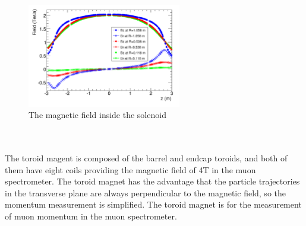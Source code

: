\begin{figure}[!h]                
	\includegraphics[width=0.6\textwidth]{Chapter2/bfield}
	\centering
	\begin{center}
		\caption{The magnetic field inside the solenoid }
		\label{Fig:bfield}            
	\end{center}
\end{figure}
\\
\\The toroid magent is composed of the barrel and endcap toroids, and both of them have eight coils providing the magnetic field of 4T in the muon spectrometer. The toroid magnet has the advantage that the particle trajectories in the transverse plane are always perpendicular to the magnetic field, so the momentum measurement is simplified. The toroid magnet is for the measurement of muon momentum in the muon spectrometer. 
